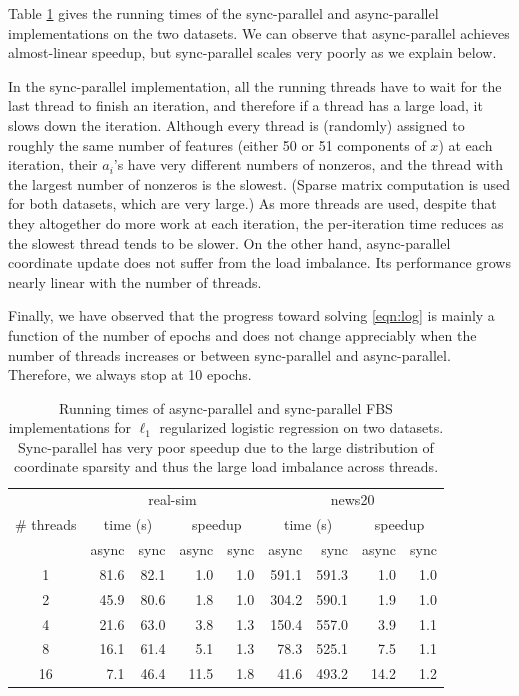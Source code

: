 Table \ref{tab:log_time} gives the running times of  the sync-parallel and async-parallel implementations on the two datasets. We can observe that async-parallel achieves almost-linear speedup, but sync-parallel scales very poorly as we explain below.

In the sync-parallel implementation,  all the running threads have to wait for the last thread to finish an iteration, and therefore if a thread has a large load, it slows down the iteration. Although every thread is (randomly) assigned to roughly the same number of features (either 50 or 51 components of $x$) at each iteration, their  $a_i$'s have very different numbers of nonzeros, and the thread with the largest number of nonzeros is the slowest. (Sparse matrix computation is used for both datasets, which are very large.) As more threads are used,  despite that they altogether do more work at each iteration,  the per-iteration time reduces as the slowest thread tends to be slower. On the other hand, async-parallel coordinate update does not suffer from the  load imbalance. Its performance grows nearly linear with the number of threads.

Finally, we have observed that the progress toward solving \eqref{eqn:log} is mainly a function of the number of epochs and does not change appreciably  when the number of threads increases or between sync-parallel and async-parallel. Therefore, we always stop at 10 epochs.


\begin{table}[htbp]
\centering
 \begin{tabular}{|c|r|r|r|r|r|r|r|r|}
  \hline
  \multirow{3}{*}{\# threads} & \multicolumn{4}{|c|}{real-sim} & \multicolumn{4}{c|}{news20} \\
  \cline{2-9}
  & \multicolumn{2}{|c|}{time (s)} &  \multicolumn{2}{c|}{speedup} &  \multicolumn{2}{c|}{time (s)} & \multicolumn{2}{c|}{speedup}\\
  \cline{2-9}
  & async & sync &  async & sync &  async & sync &  async & sync \\
  \hline
   1 &   81.6 &  82.1 & 1.0   & 1.0 & 591.1   & 591.3 & 1.0   & 1.0\\
   2 &   45.9   &  80.6 & 1.8   & 1.0 & 304.2   & 590.1 & 1.9   & 1.0\\
   4 &   21.6   &  63.0   & 3.8   & 1.3 & 150.4   & 557.0 & 3.9   & 1.1\\
   8 &   16.1   &  61.4   & 5.1   & 1.3 & 78.3     & 525.1 & 7.5   & 1.1\\
   16 & 7.1     &  46.4   & 11.5 & 1.8 & 41.6     & 493.2 & 14.2 & 1.2\\
  \hline
 \end{tabular}
 \caption{\label{tab:log_time}Running times of async-parallel and sync-parallel FBS implementations for $\ell_1$ regularized logistic regression on two datasets. Sync-parallel has very poor speedup  due to the large distribution of coordinate sparsity and thus the large load imbalance across threads.}
\end{table}

